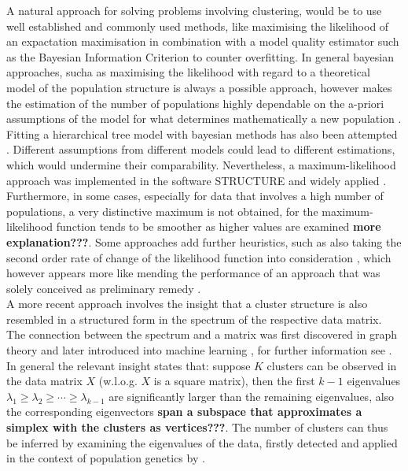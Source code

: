 \documentclass[a4paper, 11pt]{article}
\begin{document}
A natural approach for solving problems involving clustering, would be to use well established and commonly used methods, like maximising the likelihood of an expactation maximisation in combination with a model quality estimator such as the Bayesian Information Criterion to counter overfitting. In general bayesian approaches, sucha as maximising the likelihood with regard to a theoretical model of the population structure is always a possible approach, however makes the estimation of the number of populations highly dependable on the a-priori assumptions of the model for what determines mathematically a new population \cite{falush2003inference}. Fitting a hierarchical tree model with bayesian methods has also been attempted \cite{corander2004baps}. Different assumptions from different models could lead to different estimations, which would undermine their comparability. Nevertheless, a maximum-likelihood approach was implemented in the software STRUCTURE \cite{pritchard2000inference} \cite{falush2003inference} and widely applied \cite{rosenberg2002genetic} \cite{harter2004origin} \cite{rosenberg2001empirical}. Furthermore, in some cases, especially for data that involves a high number of populations, a very distinctive maximum is not obtained, for the maximum-likelihood function tends to be smoother as higher values are examined \textbf{more explanation???}. Some approaches add further heuristics, such as also taking the second order rate of change of the likelihood function into consideration \cite{evanno2005detecting}, which however appears more like mending the performance of an approach that was solely conceived as preliminary remedy \cite{pritchard2000inference}.\\
A more recent approach involves the insight that a cluster structure is also resembled in a structured form in the spectrum of the respective data matrix. The connection between the spectrum and a matrix was first discovered in graph theory \cite{donath1973lower} \cite{fiedler1973algebraic} and later introduced into machine learning \cite{shi2000normalized} \cite{meila2001random} \cite{ng2002spectral}, for further information see \cite{von2007tutorial}. In general the relevant insight states that: suppose $K$ clusters can be observed in the data matrix $X$ (w.l.o.g. $X$ is a square matrix), then the first $k-1$ eigenvalues $\lambda_1 \geq \lambda_2 \geq \cdots \geq \lambda_{k-1}$ are significantly larger than the remaining eigenvalues, also the corresponding eigenvectors \textbf{span a subspace that approximates a simplex with the clusters as vertices???}. The number of clusters can thus be inferred by examining the eigenvalues of the data, firstly detected and applied in the context of population genetics by \cite{patterson2006population}. 
\end{document}
